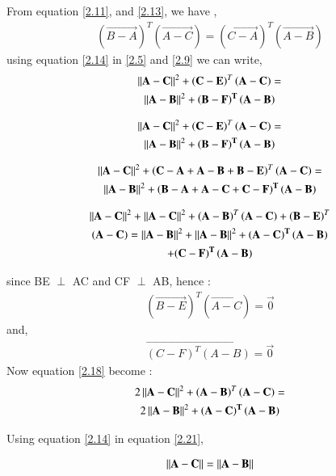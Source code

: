 \documentclass[journal,12pt,twocolumn]{IEEEtran}
\begin{document}
  
  From equation \ref{2.11}, and \ref{2.13}, we have ,
  \begin{multline} 
    \left( \vec{ B - A} \right)^T  \left( \vec{A - C } \right) =  \left( \vec{ C - A} \right)^T  \left( \vec{A - B } \right) \label{2.14}
   \end{multline} 
 using equation \ref{2.14} in \ref{2.5} and \ref{2.9} we can write,
   \begin{multline} 
   \left\lVert\mathbf{A - C}\right\rVert^2 + \left ( \mathbf{ C - E }\right)^T \left( \mathbf{A - C} \right)  =  \\ \left\lVert\mathbf{A - B}\right\rVert^2 + \mathbf{\left (  B - F\right)^{T} \left( A - B \right)}
    \end{multline} 
   
  \begin{multline} 
\left\lVert\mathbf{A - C}\right\rVert^2 + \left ( \mathbf{ C - E }\right)^T \left( \mathbf{A - C} \right)  =  \\ \left\lVert\mathbf{A - B}\right\rVert^2 + \mathbf{\left (  B - F\right)^{T} \left( A - B \right)}
 \end{multline}   
   
    \begin{multline} 
  \left\lVert\mathbf{A - C}\right\rVert^2 + \left ( \mathbf{ C - A + A - B +B - E }\right)^T \left( \mathbf{A - C} \right)  =  \\ \left\lVert\mathbf{A - B}\right\rVert^2 + \mathbf{\left (  B - A + A - C + C - F\right)^{T} \left( A - B \right)}
   \end{multline}   
  
 \begin{multline} 
\left\lVert\mathbf{A - C}\right\rVert^2 +  \left\lVert\mathbf{A - C}\right\rVert^2 + \left ( \mathbf{  A - B  }\right)^T \left( \mathbf{A - C} \right) + \left ( \mathbf{   B - E }\right)^T \\ \left( \mathbf{A - C} \right) =   \left\lVert\mathbf{A - B}\right\rVert^2 + \left\lVert\mathbf{A - B}\right\rVert^2 + \mathbf{\left ( A - C \right)^{T} \left( A - B \right)}  \\ +  \mathbf{\left (  C - F\right)^{T} \left( A - B \right)} \label{2.18}
 \end{multline}    
  
since BE $\perp$ AC and CF $\perp$ AB, hence :
\begin{align}
 \left ( \vec{   B - E }\right)^T \left( \vec{A - C} \right) = \vec{0}
 \end{align}
  and, 
  \begin{align}
   \vec{\left (  C - F\right)^{T} \left( A - B \right)} = \vec{0}
\end{align}
Now equation \ref{2.18} become :
 \begin{multline}
2\left\lVert\mathbf{A - C}\right\rVert^2 + \left ( \mathbf{  A - B  }\right)^T \left( \mathbf{A - C} \right)    =  \\ 2 \left\lVert\mathbf{A - B}\right\rVert^2 + \mathbf{\left ( A - C \right)^{T} \left( A - B \right)} \label{2.21}
 \end{multline} 

  Using equation \ref{2.14} in equation \ref{2.21},
  
  \begin{align}
  \left\lVert\mathbf{A - C} \right\rVert = \left\lVert\mathbf{A - B}\right\rVert
  \end{align}
  
  
  
  
  
  
\end{document}
